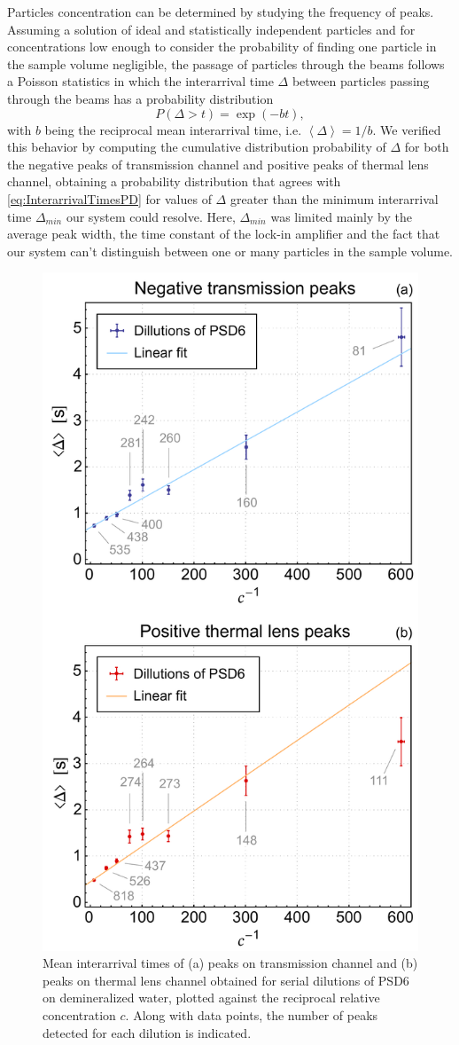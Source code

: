 \documentclass[10pt,authoryear,twocolumn]{article}
\begin{document}
Particles concentration can be determined by studying the frequency of peaks. Assuming a solution of ideal and statistically independent particles and for concentrations low enough to consider the probability of finding one particle in the sample volume negligible, the passage of particles through the beams follows a Poisson statistics in which the interarrival time $\Delta$ between particles passing through the beams has a probability distribution
\begin{equation}
	P\left(\Delta > t\right) = \exp\left( -b t \right),
\label{eq:InterarrivalTimesPD}
\end{equation}
with $b$ being the reciprocal mean interarrival time, i.e. $\left\langle \Delta \right\rangle = 1/b$. We verified this behavior by computing the cumulative distribution probability of $\Delta$ for both the negative peaks of transmission channel and positive peaks of thermal lens channel, obtaining a probability distribution that agrees with \ref{eq:InterarrivalTimesPD} for values of $\Delta$ greater than the minimum interarrival time $\Delta_{min}$ our system could resolve. Here, $\Delta_{min}$ was limited mainly by the average peak width, the time constant of the lock-in amplifier and the fact that our system can't distinguish between one or many particles in the sample volume.

\begin{figure}[t!]
	\centering \includegraphics[width=.49\textwidth]{Figuras/InterarrivalTimes.pdf}
	\caption{Mean interarrival times of (a) peaks on transmission channel and (b) peaks on thermal lens channel obtained for serial dilutions of PSD6 on demineralized water, plotted against the reciprocal relative concentration $c$. Along with data points, the number of peaks detected for each dilution is indicated.}
	\label{fig:InterarrivalTimes}
\end{figure}
\end{document}

